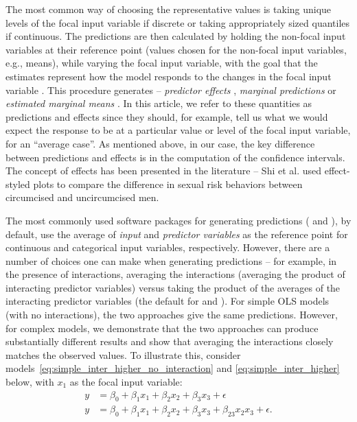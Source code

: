 The most common way of choosing the representative values is taking unique levels of the focal input variable if discrete or taking appropriately sized quantiles if continuous. The predictions are then calculated by holding the non-focal input variables at their reference point (values chosen for the non-focal input variables, e.g., means), while varying the focal input variable, with the goal that the estimates represent how the model responds to the changes in the focal input variable \citep{fox2009effect, hanmer2013behind}. This procedure generates -- \emph{predictor effects} \citep{fox2009effect}, \emph{marginal predictions} \citep{leeper2017package} or \emph{estimated marginal means} \citep{lenth2018package}. In this article, we refer to these quantities as predictions and effects since they should, for example, tell us what we would expect the response to be at a particular value or level of the focal input variable, for an ``average case''. As mentioned above, in our case, the key difference between predictions and effects is in the computation of the confidence intervals. The concept of effects has been presented in the literature -- Shi et al. \citep{shi_evidence_2017} used effect-styled plots to compare the difference in sexual risk behaviors between circumcised and uncircumcised men.

The most commonly used  software packages for generating predictions ( and ), by default, use the average of \emph{input} and \emph{predictor variables} as the reference point for continuous and categorical input variables, respectively. However, there are a number of choices one can make when generating predictions -- for example, in the presence of interactions, averaging the interactions (averaging the product of interacting predictor variables) versus taking the product of the averages of the interacting predictor variables (the default for  and ). For simple OLS models (with no interactions), the two approaches give the same predictions. However, for complex models, we demonstrate that the two approaches can produce substantially different results and show that averaging the interactions closely matches the observed values. To illustrate this, consider models~\ref{eq:simple_inter_higher_no_interaction} and \ref{eq:simple_inter_higher} below, with $x_1$ as the focal input variable:
%
\begin{align}
y &= \beta_0 + \beta_1x_1 + \beta_2x_2 + \beta_3x_3 + \epsilon \label{eq:simple_inter_higher_no_interaction}\\
y &= \beta_0 + \beta_1x_1 + \beta_2x_2 + \beta_3x_3 + \beta_{23}x_2x_3 + \epsilon \label{eq:simple_inter_higher}.
\end{align}
%

